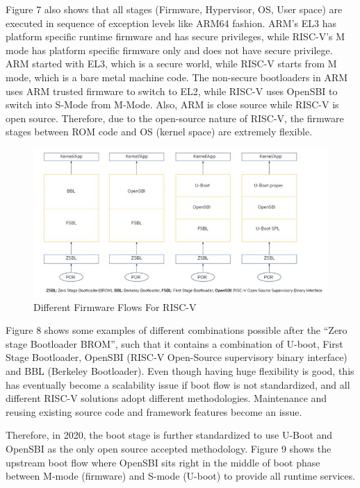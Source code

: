 \documentclass[]{rsos}%
\begin{document}
Figure 7 also shows that all stages (Firmware, Hypervisor, OS, User space) are executed in sequence of exception levels like ARM64 fashion. ARM’s EL3 has platform specific runtime firmware and has secure privileges, while RISC-V’s M mode has platform specific firmware only and does not have secure privilege. ARM started with EL3, which is a secure world, while RISC-V starts from M mode, which is a bare metal machine code. The non-secure bootloaders in ARM uses ARM trusted firmware to switch to EL2, while RISC-V uses OpenSBI to switch into S-Mode from M-Mode. Also, ARM is close source while RISC-V is open source. Therefore, due to the open-source nature of RISC-V, the firmware stages between ROM code and OS (kernel space) are extremely flexible.

\begin{figure}[hbt!]
	\centering
	\includegraphics{figs/DifferentFirmwareFlowsForRiscV.JPG}
	\caption{Different Firmware Flows For RISC-V \cite{R51:1}}
\end{figure}


Figure 8 shows some examples of different combinations possible after the “Zero stage Bootloader BROM”, such that it contains a combination of U-boot, First Stage Bootloader, OpenSBI (RISC-V Open-Source supervisory binary interface) and BBL (Berkeley Bootloader). Even though having huge flexibility is good, this has eventually become a scalability issue if boot flow is not standardized, and all different RISC-V solutions adopt different methodologies. Maintenance and reusing existing source code and framework features become an issue.

Therefore, in 2020, the boot stage is further standardized to use U-Boot and OpenSBI as the only open source accepted methodology. Figure 9 shows the upstream boot flow where OpenSBI sits right in the middle of boot phase between M-mode (firmware) and S-mode (U-boot) to provide all runtime services.
\end{document}
